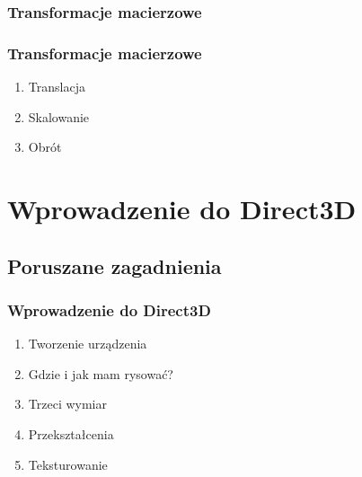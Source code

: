 \documentclass{beamer}
\begin{document}
\subsubsection{Transformacje macierzowe}
\begin{frame}
  \frametitle{Transformacje macierzowe}
  \begin{enumerate}
    \item<1-> Translacja
    \item<2-> Skalowanie
    \item<3-> Obrót
  \end{enumerate}
\end{frame}

\section{Wprowadzenie do Direct3D}
\subsection{Poruszane zagadnienia}
\begin{frame}
  \frametitle{Wprowadzenie do Direct3D}

  \begin{enumerate}
    \item Tworzenie urządzenia
    \item Gdzie i jak mam rysować?
    \item Trzeci wymiar
    \item Przekształcenia
    \item Teksturowanie
  \end{enumerate}

\end{frame}
\end{document}
